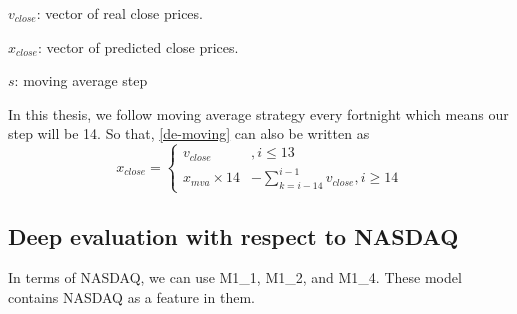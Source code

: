 \begin{enumerate}
	$v_{close}$: vector of real close prices.
	
	$x_{close}$: vector of predicted close prices.
	
	$s$: moving average step
	
	\bigskip
	
	In this thesis, we follow moving average strategy every fortnight which
	means our step will be 14. So that, \autoref{de-moving} can also be written as
	\begin{equation}
		x_{close}=
		\begin{cases}
			v_{close}        & , i \leq 13                               \\
			x_{mva}\times 14 & - \sum_{k=i-14}^{i-1}v_{close}, i \geq 14
		\end{cases}
	\end{equation}
\end{enumerate}

\subsection{Deep evaluation with respect to NASDAQ}
In terms of NASDAQ, we can use M1\_1, M1\_2, and M1\_4. These model contains NASDAQ as a feature in them.

